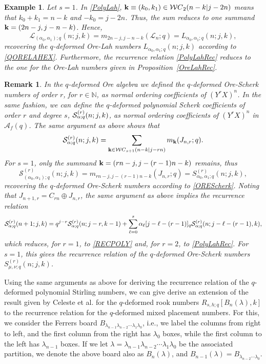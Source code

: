 \documentclass[10pt]{amsart}
\newtheorem{example}[theorem]{Example}%
\newtheorem{remark}[theorem]{Remark}%
\begin{document}
\begin{example}
Let $s=1$. In \eqref{PolyLah}, ${\bf k}\equiv (k_0,k_1) \in {\mathcal WC}_{2}(n-k|j-2n)$ means that $k_0+k_1=n-k$ and $-k_0=j-2n$. Thus, the sum reduces to one summand ${\bf k}=(2n-j,j-n-k)$. Hence,
$$
{\mathscr L}_{(\alpha_0,\alpha_1);q}(n;j,k)=m_{2n-j,j-n-k}({\mathcal L}_n;q)=L_{\alpha_0,\alpha_1;q}(n;j,k),
$$ 
recovering the $q$-deformed Ore-Lah numbers $L_{\alpha_0,\alpha_1;q}(n;j,k)$ according to \eqref{QORELAHEX}. Furthermore, the recurrence relation \eqref{PolyLahRec} reduces to the one for the Ore-Lah numbers given in Proposition~\ref{OreLahRec}.
\end{example}
\begin{remark}
In the $q$-deformed Ore algebra we defined the $q$-deformed Ore-Scherk numbers of order $r$, for $r\in \mathbb{N}$, as normal ordering coefficients of $(Y^rX)^n$. In the same fashion, we can define the {\em $q$-deformed polynomial Scherk coefficients of order $r$ and degree $s$}, ${\mathcal S}^{(r)}_{{\bf \alpha};q}(n;j,k)$, as normal ordering coefficients of $(Y^rX)^n$ in  ${\mathcal A}_f(q)$. The same argument as above shows that
\begin{equation}\label{PolyScherk}
{\mathcal S}^{(r)}_{{\bf \alpha};q}(n;j,k)=\sum_{{\bf k} \in {\mathcal WC}_{s+1}(n-k|j-rn)} m_{{\bf k}}(J_{n,r};q).
\end{equation}
For $s=1$, only the summand ${\bf k}=(rn-j,j-(r-1)n-k)$ remains, thus
$$
{\mathcal S}^{(r)}_{(\alpha_0,\alpha_1);q}(n;j,k)=m_{rn-j,j-(r-1)n-k}(J_{n,r};q)=S^{(r)}_{\alpha_0,\alpha_1;q}(n;j,k),
$$
recovering the $q$-deformed Ore-Scherk numbers according to \eqref{OREScherk}. Noting that $J_{n+1,r}=C_{rn}\oplus J_{n,r}$, the same argument as above implies the recurrence relation
$$
{\mathcal S}^{(r)}_{{\bf \alpha};q}(n+1;j,k)=q^{j-r}{\mathcal S}^{(r)}_{{\bf \alpha};q}(n;j-r,k-1)+\sum_{\ell=0}^s \alpha_{\ell} [j-\ell -(r-1)]_q {\mathcal S}^{(r)}_{{\bf \alpha};q}(n;j-\ell -(r-1),k),
$$
which reduces, for $r=1$, to \eqref{RECPOLY} and, for $r=2$, to \eqref{PolyLahRec}. For $s=1$, this gives the recurrence relation of the $q$-deformed Ore-Scherk numbers $S^{(r)}_{\mu,\nu;q}(n;j,k)$.
\end{remark}
Using the same arguments as above for deriving the recurrence relation of the $q$-deformed polynomial Stirling numbers, we can give derive an extension of the result given by Celeste et al. \cite[Theorem 7]{CCG2017} for the $q$-deformed rook numbers $R_{s, h;q}[B_{n}(\lambda),k]$ to the recurrence relation for the $q$-deformed mixed placement numbers. For this, we consider the Ferrers board $B_{\lambda_{n-1}\lambda_{n-2}\cdots \lambda_{1}\lambda_{0}}$, i.e., we label the columns from right to left, and the first column from the right has $\lambda_{0}$ boxes, while the first column to the left has $\lambda_{n-1}$ boxes. If we let $\lambda=\lambda_{n-1}\lambda_{n-2}\cdots \lambda_{1}\lambda_{0}$ be the associated partition, we denote the above board also as $B_n(\lambda)$, and $B_{n-1}(\lambda)=B_{\lambda_{n-2}\cdots  \lambda_{0}}$. 
\end{document}
